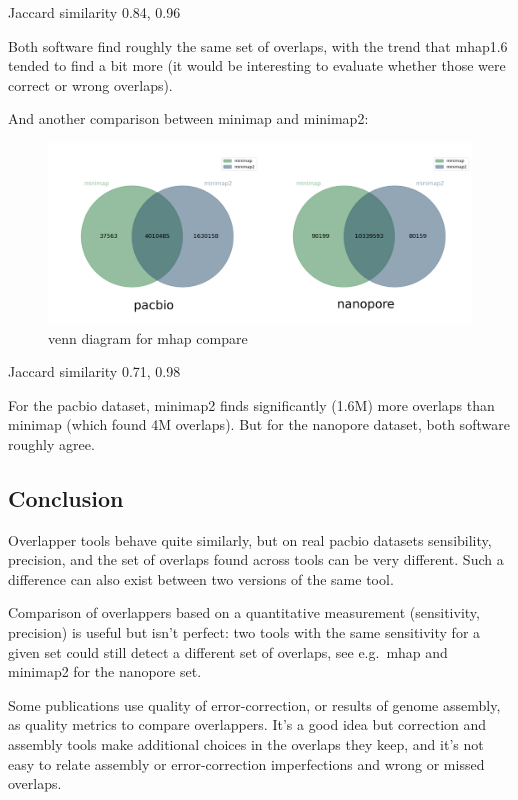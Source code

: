\documentclass[./main.tex]{subfiles}
\begin{document}
Jaccard similarity 0.84, 0.96

Both software find roughly the same set of overlaps, with the trend that
mhap1.6 tended to find a bit more (it would be interesting to evaluate
whether those were correct or wrong overlaps).

And another comparison between minimap and minimap2:

\begin{figure}[ht]
\centering
\includegraphics[width=\textwidth]{paper/blog_post/minimap_venn.png}
\caption{venn diagram for mhap compare}
\end{figure}

Jaccard similarity 0.71, 0.98

For the pacbio dataset, minimap2 finds significantly (1.6M) more
overlaps than minimap (which found 4M overlaps). But for the nanopore
dataset, both software roughly agree.

\subsection{Conclusion}\label{preassembly:ovl:conclusion}

Overlapper tools behave quite similarly, but on real pacbio
datasets sensibility, precision, and the set of overlaps found across tools can
be very different. Such a difference can also exist between two versions
of the same tool.

Comparison of overlappers based on a quantitative measurement
(sensitivity, precision) is useful but isn't perfect: two tools with the
same sensitivity for a given set could still detect a different set of
overlaps, see e.g.~mhap and minimap2 for the nanopore set.

Some publications use quality of error-correction, or results of genome
assembly, as quality metrics to compare overlappers. It's a good idea
but correction and assembly tools make additional choices in the
overlaps they keep, and it's not easy to relate assembly or
error-correction imperfections and wrong or missed overlaps.
\end{document}
